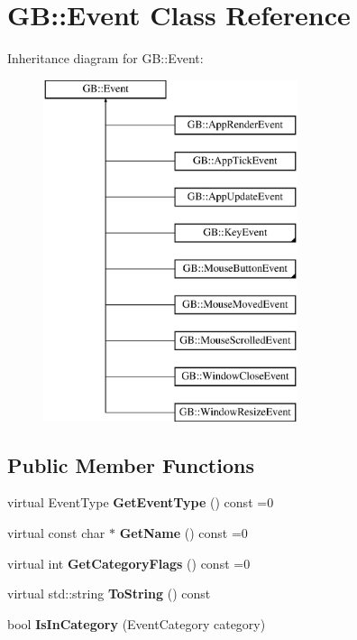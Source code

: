 \hypertarget{class_g_b_1_1_event}{}\section{GB\+::Event Class Reference}
\label{class_g_b_1_1_event}
Inheritance diagram for GB\+::Event\+:\begin{figure}[H]
\begin{center}
\leavevmode
\includegraphics[height=10.000000cm]{class_g_b_1_1_event}
\end{center}
\end{figure}
\subsection*{Public Member Functions}
\begin{DoxyCompactItemize}
\item 
\mbox{\label{class_g_b_1_1_event_aa5afb61da35e6ef55e72cde106e92148}} 
virtual Event\+Type {\bfseries Get\+Event\+Type} () const =0
\item 
\mbox{\label{class_g_b_1_1_event_a976416bf8cec4e934e4bd35192dd47e6}} 
virtual const char $\ast$ {\bfseries Get\+Name} () const =0
\item 
\mbox{\label{class_g_b_1_1_event_a26635a965431c8ad68488e1a7d86810b}} 
virtual int {\bfseries Get\+Category\+Flags} () const =0
\item 
\mbox{\label{class_g_b_1_1_event_a75aca1cd10ba253a13837ef084b6a217}} 
virtual std\+::string {\bfseries To\+String} () const
\item 
\mbox{\label{class_g_b_1_1_event_a581dc61a57fab03f58a35a2aaa6cbc41}} 
bool {\bfseries Is\+In\+Category} (Event\+Category category)
\end{DoxyCompactItemize}
